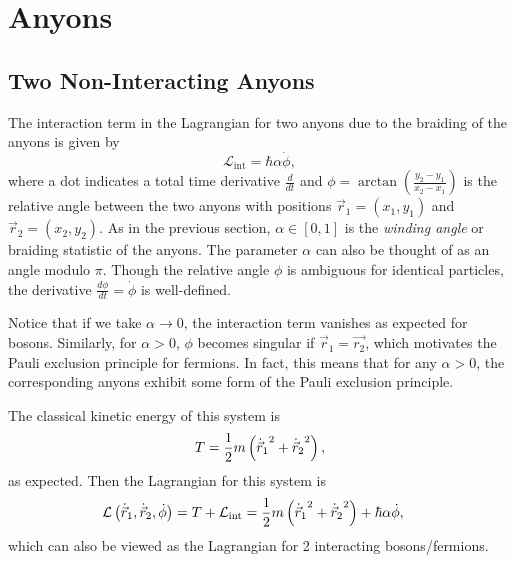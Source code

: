 \chapter{Anyons}\label{ch:anyons}


\section{Two Non-Interacting Anyons}\label{sec:non_int}

The interaction term in the Lagrangian for two anyons due to the braiding of the anyons is given by
\begin{equation}
    \mathcal{L}_{\text{int}} = \hbar\alpha\dot{\phi},
\end{equation}
where a dot indicates a total time derivative $\frac{d}{dt}$ and $\phi = \arctan\left( \frac{y_2-y_1}{x_2-x_1} \right)$ is the relative angle between the two anyons with positions $\vec{r}_1=(x_1,y_1)$ and $\vec{r}_2=(x_2,y_2)$. As in the previous section, $\alpha\in\left[ 0,1 \right]$ is the \textit{winding angle} or braiding statistic of the anyons. The parameter $\alpha$ can also be thought of as an angle modulo $\pi$. Though the relative angle $\phi$ is ambiguous for identical particles, the derivative $\frac{d\phi}{dt}=\dot{\phi}$ is well-defined.

Notice that if we take $\alpha\to 0$, the interaction term vanishes as expected for bosons. Similarly, for $\alpha>0$, $\phi$ becomes singular if $\vec{r}_1 = \vec{r_2}$, which motivates the Pauli exclusion principle for fermions. In fact, this means that for any $\alpha>0$, the corresponding anyons exhibit some form of the Pauli exclusion principle.

The classical kinetic energy of this system is
\begin{equation}
    T = \frac{1}{2}m\left( {\dot{\vec{r}}_1}^2 + {\dot{\vec{r}}_2}^2 \right),
\end{equation}
as expected. Then the Lagrangian for this system is
\begin{align}
    \mathcal{L}\left( \dot{\vec{r}}_1,\dot{\vec{r}}_2, \dot{\phi} \right) &= T + \mathcal{L}_{\text{int}} = \frac{1}{2}m\left( {\dot{\vec{r}}_1}^2 + {\dot{\vec{r}}_2}^2 \right) + \hbar\alpha\dot{\phi},
\end{align}
which can also be viewed as the Lagrangian for 2 interacting bosons/fermions.

